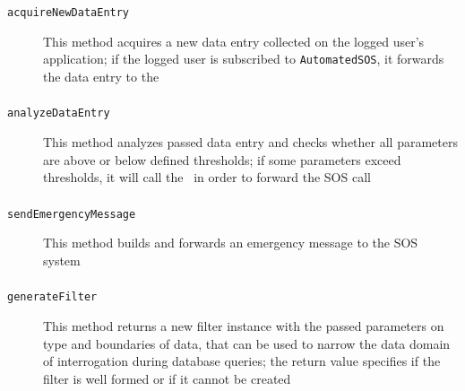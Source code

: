 \documentclass[../DD0.tex]{subfiles}
\begin{document}
    \subsubsection{\DataCollector}
    \label{sec:datacollectormethod}
      \begin{description}
        \item[\texttt{acquireNewDataEntry}] This method acquires a new data entry collected on the logged user's application; if the logged user is subscribed to \texttt{AutomatedSOS}, it forwards the data entry to the \EmergencyDetector
      \end{description}

    \subsubsection{\EmergencyDetector}

      \begin{description}
        \item[\texttt{analyzeDataEntry}] This method analyzes passed data entry and checks whether all parameters are above or below defined thresholds; if some parameters exceed thresholds, it will call the \EmergencyDispatcher\ in order to forward the SOS call
      \end{description}

    \subsubsection{\EmergencyDispatcher}

      \begin{description}
        \item[\texttt{sendEmergencyMessage}] This method builds and forwards an emergency message to the SOS system
      \end{description}

    \subsubsection{\FilterManager}

      \begin{description}
        \item[\texttt{generateFilter}] This method returns a new filter instance with the passed parameters on type and boundaries of data, that can be used to narrow the data domain of interrogation during database queries; the return value specifies if the filter is well formed or if it cannot be created
      \end{description}
\end{document}

